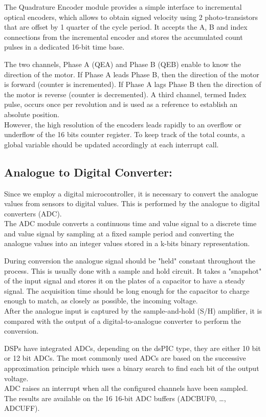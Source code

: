 The Quadrature Encoder module provides a simple interface to incremental optical encoders, which allows to obtain signed velocity using 2 photo-transistors that are offset by 1 quarter of the cycle period. It accepts the A, B and index connections from the incremental encoder and stores the accumulated count pulses in a dedicated 16-bit time base.

The two channels, Phase A (QEA) and Phase B (QEB) enable to know the direction of the motor. If Phase A leads Phase B, then the direction of the motor is forward (counter is incremented). If Phase A lags Phase B then the direction of the motor is reverse (counter is decremented). A third channel, termed Index pulse, occurs once per revolution and is used as a reference to establish an absolute position.\\
However, the high resolution of the encoders leads rapidly to an overflow or underflow of the 16 bits counter register. To keep track of the total counts, a global variable should be updated accordingly at each interrupt call.

\subsection{Analogue to Digital Converter:}

Since we employ a digital microcontroller, it is necessary to convert the analogue values from sensors to digital values. This is performed by the analogue to digital converters (ADC).\\
The ADC module converts a continuous time and value signal to a discrete time and value signal by sampling at a fixed sample period and converting the analogue values into an integer values stored in a k-bits binary representation.

During conversion the analogue signal should be "held" constant throughout the process. This is usually done with a sample and hold circuit. It takes a "snapshot" of the input signal and stores it on the plates of a capacitor to have a steady signal. The acquisition time should be long enough for the capacitor to charge enough to match, as closely as possible, the incoming voltage.\\
After the analogue input is captured by the sample-and-hold (S/H) amplifier, it is compared with the output of a digital-to-analogue converter to perform the conversion. 

DSPs have integrated ADCs, depending on the dsPIC type, they are either 10 bit or 12 bit ADCs.  The most commonly used ADCs are based on the successive approximation principle which uses a binary search to find each bit of the output voltage.\\
ADC raises an interrupt when all the configured channels have been sampled. The results are available on the 16 16-bit ADC buffers (ADCBUF0, …, ADCUFF).


